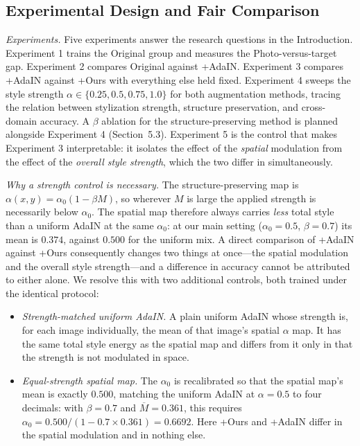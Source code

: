 \subsection{Experimental Design and Fair Comparison}
\label{sec:exp_design}

\textit{Experiments.} Five experiments answer the research questions in the Introduction. Experiment 1 trains the Original group and measures the Photo-versus-target gap. Experiment 2 compares Original against +AdaIN. Experiment 3 compares +AdaIN against +Ours with everything else held fixed. Experiment 4 sweeps the style strength $\alpha \in \{0.25, 0.5, 0.75, 1.0\}$ for both augmentation methods, tracing the relation between stylization strength, structure preservation, and cross-domain accuracy. A $\beta$ ablation for the structure-preserving method is planned alongside Experiment 4 (Section~5.3). Experiment 5 is the control that makes Experiment 3 interpretable: it isolates the effect of the \emph{spatial} modulation from the effect of the \emph{overall style strength}, which the two differ in simultaneously.

\textit{Why a strength control is necessary.} The structure-preserving map is $\alpha(x,y) = \alpha_0(1-\beta M)$, so wherever $M$ is large the applied strength is necessarily below $\alpha_0$. The spatial map therefore always carries \emph{less} total style than a uniform AdaIN at the same $\alpha_0$: at our main setting ($\alpha_0 = 0.5$, $\beta = 0.7$) its mean is $0.374$, against $0.500$ for the uniform mix. A direct comparison of +AdaIN against +Ours consequently changes two things at once---the spatial modulation and the overall style strength---and a difference in accuracy cannot be attributed to either alone. We resolve this with two additional controls, both trained under the identical protocol:

\begin{itemize}
\item \textit{Strength-matched uniform AdaIN.} A plain uniform AdaIN whose strength is, for each image individually, the mean of that image's spatial $\alpha$ map. It has the same total style energy as the spatial map and differs from it only in that the strength is not modulated in space.
\item \textit{Equal-strength spatial map.} The $\alpha_0$ is recalibrated so that the spatial map's mean is exactly $0.500$, matching the uniform AdaIN at $\alpha = 0.5$ to four decimals: with $\beta = 0.7$ and $\overline{M} = 0.361$, this requires $\alpha_0 = 0.500 / (1 - 0.7 \times 0.361) = 0.6692$. Here +Ours and +AdaIN differ in the spatial modulation and in nothing else.
\end{itemize}

